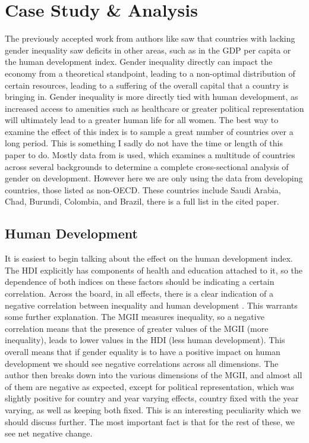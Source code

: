 \documentclass[12pt, letterpaper]{article}
\begin{document}
\section{Case Study \& Analysis}
The previously accepted work from authors like \cite{bhatt,elson} saw that countries with lacking gender inequality saw deficits in other areas, such as in the GDP per capita or the human development index. Gender inequality directly can impact the economy from a theoretical standpoint, leading to a non-optimal distribution of certain resources, leading to a suffering of the overall capital that a country is bringing in. Gender inequality is more directly tied with human development, as increased access to amenities such as healthcare or greater political representation will ultimately lead to a greater human life for all women. The best way to examine the effect of this index is to sample a great number of countries over a long period. This is something I sadly do not have the time or length of this paper to do. Mostly data from \cite{ferrant} is used, which examines a multitude of countries across several backgrounds to determine a complete cross-sectional analysis of gender on development. However here we are only using the data from developing countries, those listed as non-OECD. These countries include Saudi Arabia, Chad, Burundi, Colombia, and Brazil, there is a full list in the cited paper.

\subsection{Human Development}
It is easiest to begin talking about the effect on the human development index. The HDI explicitly has components of health and education attached to it, so the dependence of both indices on these factors should be indicating a certain correlation. Across the board, in all effects, there is a clear indication of a negative correlation between inequality and human development \cite{ferrant}. This warrants some further explanation. The MGII measures inequality, so a negative correlation means that the presence of greater values of the MGII (more inequality), leads to lower values in the HDI (less human development). This overall means that if gender equality is to have a positive impact on human development we should see negative correlations across all dimensions. The author then breaks down into the various dimensions of the MGII, and almost all of them are negative as expected, except for political representation, which was slightly positive for country and year varying effects, country fixed with the year varying, as well as keeping both fixed. This is an interesting peculiarity which we should discuss further. The most important fact is that for the rest of these, we see net negative change.
\end{document}
